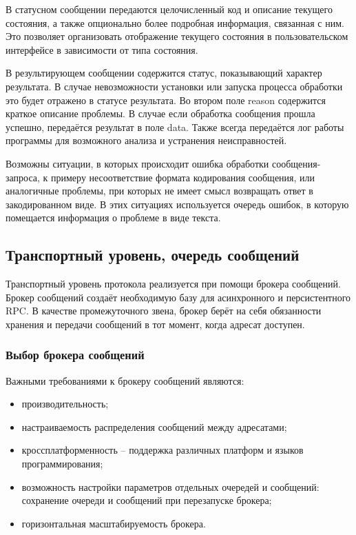 В статусном сообщении передаются целочисленный код и описание текущего
состояния, а также опционально более подробная информация, связанная с ним.
Это позволяет организовать отображение текущего состояния в пользовательском
интерфейсе в зависимости от типа состояния.

В результирующем сообщении содержится статус, показывающий характер результата.
В случае невозможности установки или запуска процесса обработки это будет
отражено в статусе результата. Во втором поле reason содержится краткое
описание проблемы. В случае если обработка сообщения прошла успешно,
передаётся результат в поле data. Также всегда передаётся лог работы
программы для возможного анализа и устранения неисправностей.

Возможны ситуации, в которых происходит ошибка обработки сообщения-запроса,
к примеру несоответствие формата кодирования сообщения, или аналогичные
проблемы, при которых не имеет смысл возвращать ответ в закодированном виде.
В этих ситуациях используется очередь ошибок, в которую помещается
информация о проблеме в виде текста.

\subsection{Транспортный уровень, очередь сообщений}
Транспортный уровень протокола реализуется при помощи брокера сообщений.
Брокер сообщений создаёт необходимую базу для асинхронного и персистентного RPC.
В качестве промежуточного звена, брокер берёт на себя обязанности хранения
и передачи сообщений в тот момент, когда адресат доступен.

\subsubsection{Выбор брокера сообщений}
Важными требованиями к брокеру сообщений являются:
\begin{itemize}
    \item производительность;
    \item настраиваемость распределения сообщений между адресатами;
    \item кроссплатформенность -- поддержка различных платформ и
        языков программирования;
    \item возможность настройки параметров отдельных очередей и сообщений:
        сохранение очереди и сообщений при перезапуске брокера;
    \item горизонтальная масштабируемость брокера.
\end{itemize}

